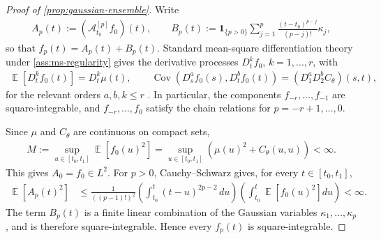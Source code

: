 \documentclass[11pt,a4paper]{article}
\theoremstyle{definition}
\theoremstyle{remark}
\DeclareMathOperator{\E}{\mathbb{E}}
\DeclareMathOperator{\Cov}{Cov}
\begin{document}
\begin{proof}[Proof of \cref{prop:gaussian-ensemble}]
Write
\begin{align*}
A_p(t) := (\mathcal A_{t_0}^{[p]}f_0)(t),
\qquad
B_p(t) := \mathbf{1}_{\{p>0\}}\sum_{j=1}^{p}\frac{(t-t_0)^{p-j}}{(p-j)!}\kappa_j,
\end{align*}
so that \(f_p(t)=A_p(t)+B_p(t)\). Standard mean-square differentiation theory under \cref{ass:ms-regularity} gives the derivative processes \(D_t^k f_0\), \(k=1,\ldots,r\), with
\begin{align*}
\E[D_t^k f_0(t)] = D_t^k\mu(t),
\qquad
\Cov(D_s^a f_0(s),D_t^b f_0(t))=(D_1^aD_2^b C_\theta)(s,t),
\end{align*}
for the relevant orders \(a,b,k\le r\) \citep[Theorem~2.5.1]{cramer1967stationary}. In particular, the components \(f_{-r},\ldots,f_{-1}\) are square-integrable, and \(f_{-r},\ldots,f_0\) satisfy the chain relations for \(p=-r+1,\ldots,0\).

Since \(\mu\) and \(C_\theta\) are continuous on compact sets,
\begin{align*}
M:=\sup_{u\in[t_0,t_1]}\E[f_0(u)^2]
=\sup_{u\in[t_0,t_1]}\left(\mu(u)^2+C_\theta(u,u)\right)<\infty.
\end{align*}
This gives \(A_0=f_0\in L^2\). For \(p>0\), Cauchy--Schwarz gives, for every \(t\in[t_0,t_1]\),
\begin{align*}
\E[A_p(t)^2]
&\le
\frac{1}{((p-1)!)^2}
\left(\int_{t_0}^t (t-u)^{2p-2}\,du\right)
\left(\int_{t_0}^t \E[f_0(u)^2]du\right)<\infty.
\end{align*}
The term \(B_p(t)\) is a finite linear combination of the Gaussian variables \(\kappa_1,\ldots,\kappa_p\), and is therefore square-integrable. Hence every \(f_p(t)\) is square-integrable.


\end{proof}
\end{document}
